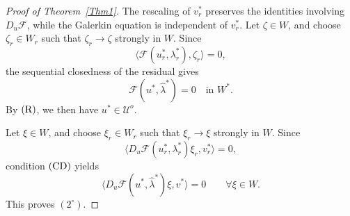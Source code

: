 \documentclass[preprint,10pt]{elsarticle}
\numberwithin{equation}{section}
\begin{document}
\begin{proof}[Proof of Theorem~\ref{Thm1}]
	The rescaling of \(v_r^*\) preserves the identities involving
	\(D_u\mathcal F\), while the Galerkin equation is independent of \(v_r^*\).
	Let \(\zeta\in W\), and choose \(\zeta_r\in W_r\) such that
	\(\zeta_r\to\zeta\) strongly in \(W\). Since
	\[
	\langle\mathcal F(u_r^*,\lambda_r^*),\zeta_r\rangle=0,
	\]
	the sequential closedness of the residual gives
	\[
	\mathcal F(u^*,\hat\lambda^*)=0
	\quad\text{in }W^* .
	\]
	By \({\rm (R)}\), we then have \(u^*\in\mathcal U^o\).
	
	Let \(\xi\in W\), and choose \(\xi_r\in W_r\) such that
	\(\xi_r\to\xi\) strongly in \(W\). Since
	\[
	\bigl\langle
	D_u\mathcal F(u_r^*,\lambda_r^*)\xi_r,v_r^*
	\bigr\rangle=0,
	\]
	condition \({\rm (CD)}\) yields
	\[
	\bigl\langle
	D_u\mathcal F(u^*,\hat\lambda^*)\xi,v^*
	\bigr\rangle=0
	\qquad \forall \xi\in W .
	\]
	This proves \((2^\circ)\).
\end{proof}
\medskip
\end{document}
